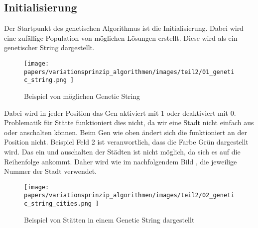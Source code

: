 %
%
%
%
\subsection{Initialisierung
\label{genetic_algorithm:initialization}}
Der Startpunkt des genetischen Algorithmus ist die Initialisierung.
Dabei wird eine zufällige Population von möglichen Lösungen erstellt.
Diese wird als ein genetischer String dargestellt.

\begin{figure} [h]
	\centering
	\texttt{[image: 
        papers/variationsprinzip\_algorithmen/images/teil2/01\_genetic\_string.png
        ]}
	\caption{Beispiel von möglichen Genetic String}
	\label{fig:possible_genetic_string}
\end{figure}

Dabei wird in jeder Position das Gen aktiviert mit 1 oder deaktiviert mit 0.
Problematik für Stätte funktioniert dies nicht, da wir eine Stadt nicht
einfach aus oder anschalten können. Beim Gen wie oben ändert sich die funktioniert
an der Position nicht. Beispiel Feld 2 ist veranwortlich, dass die Farbe Grün
dargestellt wird. Das ein und auschalten der Städten ist nicht möglich, da sich
es auf die Reihenfolge ankommt. Daher wird wie im nachfolgendem Bild 
\cite{cities_genetic_string}, die jeweilige Nummer der Stadt verwendet.

\begin{figure} [h]
	\centering
	\texttt{[image: 
        papers/variationsprinzip\_algorithmen/images/teil2/02\_genetic\_string\_cities.png
        ]}
	\caption{Beispiel von Stätten in einem Genetic String dargestellt}
	\label{fig:cities_genetic_string}
\end{figure}


